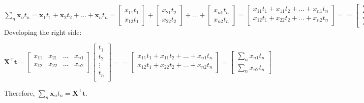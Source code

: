 \documentclass[10pt]{article}
\begin{document}
\begin{enumerate}
$\sum_{n} \mathbf{x}_n t_n = \mathbf{x}_1 t_1 + \mathbf{x}_2 t_2 + \hdots + \mathbf{x}_n t_n =
\begin{bmatrix}
x_{11} t_1 \\
x_{12} t_1 
\end{bmatrix} 
+
\begin{bmatrix}
x_{21} t_2 \\
x_{22} t_2 
\end{bmatrix} 
+
\hdots
+
\begin{bmatrix}
x_{n1} t_n \\
x_{n2} t_n 
\end{bmatrix} 
=
\begin{bmatrix}
x_{11} t_1 + x_{11} t_2 + \hdots + x_{n1} t_n  \\
x_{12} t_1 + x_{22} t_2 + \hdots + x_{n2} t_n  \\
\end{bmatrix} 
=

=\begin{bmatrix}
\sum_{n} {x}_{n1} t_n  \\[0.3em]
\sum_{n} {x}_{n2} t_n 
\end{bmatrix} 
$ \\[1.0cm]

Developing the right side:

$\mathbf{X}^\top\mathbf{t} 
=
\begin{bmatrix}
    x_{11} & x_{21}  & \hdots  & x_{n1}\\[0.1em]
    x_{12} & x_{22}  & \hdots & x_{n2}\\[0.1em]
    \end{bmatrix}
 \begin{bmatrix}
    t_1 \\[0.1em]
    t_2 \\[0.1em]
    \vdots \\[0.1em]
    t_n \\[0.1em]
    \end{bmatrix}
=
= \begin{bmatrix}
x_{11} t_1 + x_{11} t_2 + \hdots + x_{n1} t_n  \\
x_{12} t_1 + x_{22} t_2 + \hdots + x_{n2} t_n  \\
\end{bmatrix} 
=
\begin{bmatrix}
\sum_{n} {x}_{n1} t_n  \\[0.3em]
\sum_{n} {x}_{n2} t_n 
\end{bmatrix} 
$

Therefore, $\sum_{n} \mathbf{x}_n t_n = \mathbf{X}^\top\mathbf{t}$.\\[1.cm]


\end{enumerate}
\end{document}
